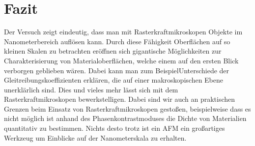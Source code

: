 

\chapter{Fazit}
\label{chap:fazit}


Der Versuch zeigt eindeutig, dass man mit Rasterkraftmikroskopen Objekte im Nanometerbereich auflösen kann. Durch diese Fähigkeit Oberflächen auf so kleinen Skalen zu betrachten eröffnen sich 
gigantische Möglichkeiten zur Charakterisierung von Materialoberflächen, welche einem auf den ersten Blick verborgen geblieben wären. Dabei kann man zum BeispielUnterschiede der Gleitreibungskoeffizienten erklären, 
die auf einer makroskopischen Ebene unerklärlich sind. Dies und vieles mehr lässt sich mit dem Rasterkraftmikroskopen bewerkstelligen. Dabei sind wir auch an praktischen Grenzen beim 
Einsatz von Rasterkraftmikroskopen gestoßen, beispielweise dass es nicht möglich ist anhand des Phasenkontrastmoduses die Dichte von Materialien quantitativ zu bestimmen. Nichts 
desto trotz ist ein AFM ein großartiges Werkzeug um Einblicke auf der Nanometerskala zu erhalten. 
